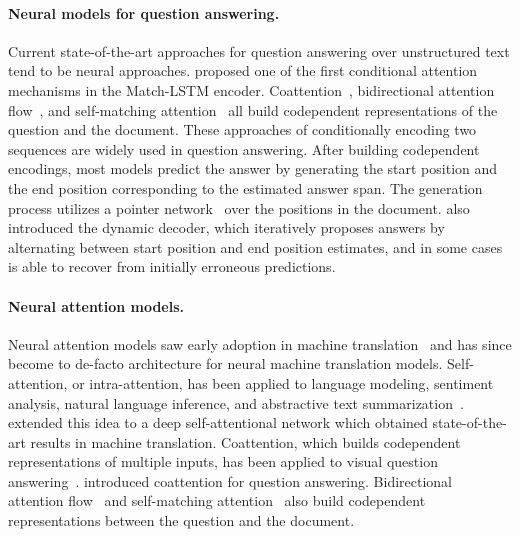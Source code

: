 \documentclass{article} \usepackage{iclr2018_conference,times}
\begin{document}
\paragraph{Neural models for question answering.}
Current state-of-the-art approaches for question answering over unstructured text tend to be neural approaches.
\citet{Wang2016MachineCU} proposed one of the first conditional attention mechanisms in the Match-LSTM encoder.
Coattention~\citep{xiong2016dynamic}, bidirectional attention flow~\citep{Seo2016BidirectionalAF}, and self-matching attention~\citep{rnet} all build codependent representations of the question and the document.
These approaches of conditionally encoding two sequences are widely used in question answering.
After building codependent encodings, most models predict the answer by generating the start position and the end position corresponding to the estimated answer span.
The generation process utilizes a pointer network~\citep{Vinyals2015PointerN} over the positions in the document.
\citet{xiong2016dynamic} also introduced the dynamic decoder, which iteratively proposes answers by alternating between start position and end position estimates, and in some cases is able to recover from initially erroneous predictions.


\paragraph{Neural attention models.}
Neural attention models saw early adoption in machine translation~\citep{bahdanau2014neural} and has since become to de-facto architecture for neural machine translation models.
Self-attention, or intra-attention, has been applied to language modeling, sentiment analysis, natural language inference, and abstractive text summarization~\citep{Chen2017ReadingWT,Paulus2017ADR}.
\citet{Vaswani2017AttentionIA} extended this idea to a deep self-attentional network which obtained state-of-the-art results in machine translation.
Coattention, which builds codependent representations of multiple inputs, has been applied to visual question answering~\citep{Lu2016HierarchicalQC}.
\citet{xiong2016dynamic} introduced coattention for question answering.
Bidirectional attention flow~\citep{Seo2016BidirectionalAF} and self-matching attention~\citep{rnet} also build codependent representations between the question and the document.
\end{document}
